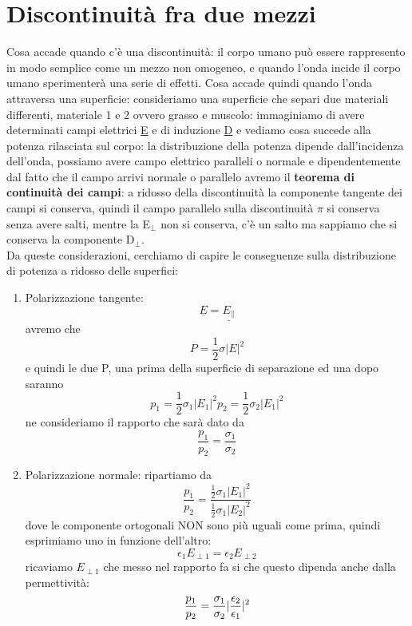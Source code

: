 \documentclass[oneside, 12pt]{extbook}
\DeclarePairedDelimiter{\abs}{\lvert}{\rvert}
\begin{document}
\section{Discontinuità fra due mezzi}
Cosa accade quando c'è una discontinuità: il corpo umano può essere rappresento in modo semplice come un mezzo non omogeneo, e quando l'onda incide il corpo umano sperimenterà una serie di effetti. Cosa accade quindi quando l'onda attraversa una superficie: consideriamo una superficie che separi due materiali differenti, materiale 1 e 2 ovvero grasso e muscolo: immaginiamo di avere determinati campi elettrici \underline{E} e di induzione \underline{D} e vediamo cosa succede alla potenza rilasciata sul corpo: la distribuzione della potenza dipende dall'incidenza dell'onda, possiamo avere campo elettrico paralleli o normale e dipendentemente dal fatto che il campo arrivi normale o parallelo avremo il \textbf{teorema di continuità dei campi}: a ridosso della discontinuità la componente tangente dei campi si conserva, quindi il campo parallelo sulla discontinuità $\pi$ si conserva senza avere salti, mentre la E$_\perp$ non si conserva, c'è un salto ma sappiamo che si conserva la componente D$_\perp$.\\Da queste considerazioni, cerchiamo di capire le conseguenze sulla distribuzione di potenza a ridosso delle superfici:
\begin{enumerate}
	\item Polarizzazione tangente:
	\begin{equation}
		\underline{E} = \underline{E_{\parallel}}
	\end{equation}
	avremo che 
	\begin{equation}
		P = \frac{1}{2}\sigma|E|^2
	\end{equation}
	e quindi le due P, una prima della superficie di separazione ed una dopo saranno 
	\begin{equation}
		p_1 = \frac{1}{2}\sigma_1|E_1|^2 p_2 = \frac{1}{2}\sigma_2|E_1|^2
	\end{equation} ne consideriamo il rapporto che sarà dato da
	\begin{equation}
		\frac{p_1}{p_2} = \frac{\sigma_1}{\sigma_2}
	\end{equation}
	\item Polarizzazione normale: ripartiamo da 
	\begin{equation}
		\frac{p_1}{p_2} = \dfrac{\frac{1}{2}\sigma_1|E_1|^2}{\frac{1}{2}\sigma_1|E_2|^2}
	\end{equation}
	dove le componente ortogonali NON sono più uguali come prima, quindi esprimiamo uno in funzione dell'altro: 
	\begin{equation}
		\epsilon_1 E_{\perp1} = \epsilon_2 E_{\perp2}
	\end{equation}
	ricaviamo $E_{\perp1}$ che messo nel rapporto fa si che questo dipenda anche dalla permettività:
	\begin{equation}
		\frac{p_1}{p_2} = \frac{\sigma_1}{\sigma_2} \abs{ \frac{\epsilon_2}{\epsilon_1}}^2
	\end{equation}
\end{enumerate}
\end{document}
